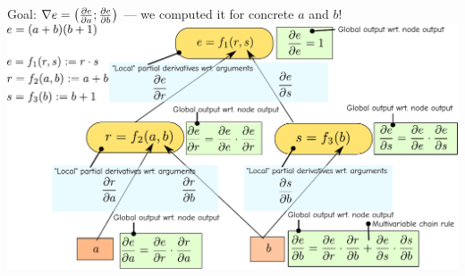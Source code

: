\documentclass[12pt,aspectratio=169,handout]{beamer}
\begin{document}
\begin{frame}{Goal: $\nabla e = \left( \pdv{e}{a}; \pdv{e}{b} \right)$ --- we computed it for concrete $a$ and $b$!}
	\includegraphics[width=1.2\linewidth]{img/backprop10.pdf}
\end{frame}
\end{document}
